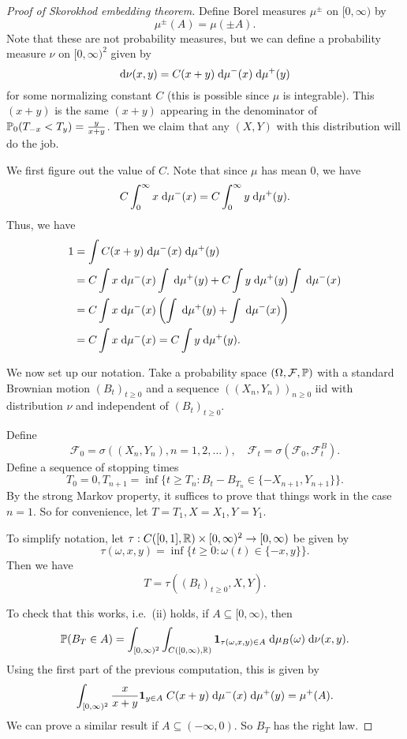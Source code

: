 \documentclass[a4paper]{article}
\begin{document}
\begin{proof}[Proof of Skorokhod embedding theorem]
  Define Borel measures $\mu^{\pm}$ on $[0, \infty)$ by
  \[
    \mu^{\pm}(A) = \mu(\pm A).
  \]
  Note that these are not probability measures, but we can define a probability measure $\nu$ on $[0, \infty)^2$ given by
  \[
    \d \nu(x, y) = C(x + y)\; \d \mu^-(x) \;\d \mu^+(y)
  \]
  for some normalizing constant $C$ (this is possible since $\mu$ is integrable). This $(x + y)$ is the same $(x + y)$ appearing in the denominator of $\P_0(T_{-x} < T_y) = \frac{y}{x + y}$. Then we claim that any $(X, Y)$ with this distribution will do the job.

  We first figure out the value of $C$. Note that since $\mu$ has mean $0$, we have
  \[
    C \int_0^\infty x \;\d \mu^-(x) = C \int_0^\infty y \;\d \mu^+(y).
  \]
  Thus, we have
  \begin{align*}
    1 &= \int C(x + y) \;\d \mu^-(x) \;\d \mu^+(y) \\
    &= C \int x\;\d \mu^-(x) \int \;\d \mu^+(y) + C \int y\;\d \mu^+(y) \int\;\d \mu^-(x)\\
    &= C \int x \;\d \mu^-(x) \left( \int \;\d \mu^+(y) + \int\;\d \mu^-(x)\right) \\
    &= C \int x\;\d \mu^-(x) = C \int y\;\d \mu^+(y).
  \end{align*}

  We now set up our notation. Take a probability space $(\Omega, \mathcal{F}, \P)$ with a standard Brownian motion $(B_t)_{t \geq 0}$ and a sequence $((X_n, Y_n))_{n \geq 0}$ iid with distribution $\nu$ and independent of $(B_t)_{t \geq 0}$.

  Define
  \[
    \mathcal{F}_0 = \sigma((X_n, Y_n), n = 1, 2, \ldots),\quad
    \mathcal{F}_t = \sigma(\mathcal{F}_0, \mathcal{F}_t^B).
  \]
  Define a sequence of stopping times
  \[
    T_0 = 0, T_{n + 1} = \inf\{t \geq T_n: B_t - B_{T_n} \in \{-X_{n + 1}, Y_{n + 1}\}\}.
  \]
  By the strong Markov property, it suffices to prove that things work in the case $n = 1$. So for convenience, let $T = T_1, X = X_1, Y = Y_1$.

  To simplify notation, let $\tau: C([0, 1], \R) \times [0, \infty)^2 \to [0, \infty)$ be given by
  \[
    \tau(\omega, x, y) = \inf \{t \geq 0: \omega(t) \in \{-x, y\}\}.
  \]
  Then we have
  \[
    T = \tau((B_t)_{t \geq 0}, X, Y).
  \]

  To check that this works, i.e.\ (ii) holds, if $A \subseteq [0, \infty)$, then
  \[
    \P(B_T \in A) = \int_{[0,\infty)^2} \int_{C([0, \infty), \R)} \mathbf{1}_{\tau(\omega, x, y) \in A} \;\d \mu_B(\omega) \;\d \nu(x, y).
  \]
  Using the first part of the previous computation, this is given by
  \[
    \int_{[0, \infty)^2} \frac{x}{x + y} \mathbf{1}_{y \in A}\; C(x + y) \;\d \mu^-(x) \;\d \mu^+(y) = \mu^+(A).
  \]
  We can prove a similar result if $A \subseteq (-\infty, 0)$. So $B_T$ has the right law.


\end{proof}
\end{document}
